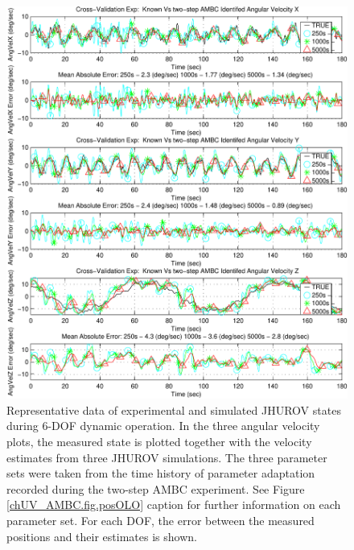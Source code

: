 \begin{center}
\begin{figure}[htbp]
  \begin{center}
    \includegraphics[width=150mm]{./chUV_AMBC/images/OLO_angVel}
  \end{center}
  \caption{ Representative data of experimental and simulated
    \ac{JHUROV} states during 6-\ac{DOF} dynamic operation.  In the
    three angular velocity plots, the measured state is plotted
    together with the velocity estimates from three \ac{JHUROV}
    simulations. The three parameter sets were taken from the time
    history of parameter adaptation recorded during the two-step
    \ac{AMBC} experiment.  See Figure \ref{chUV_AMBC.fig.posOLO}
    caption for further information on each parameter set.  For each
    \ac{DOF}, the error between the measured positions and their
    estimates is shown.  }
  \label{chUV_AMBC.fig.angVelOLO}
\end{figure}
\end{center}

